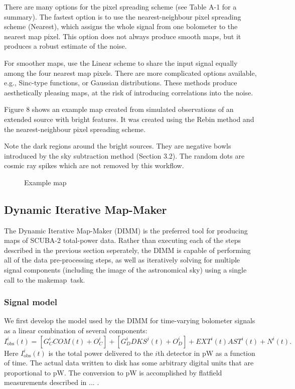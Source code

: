 \documentclass[twoside,11pt]{article}
\newcommand{\xref}[3]{#1}
\newcommand{\xlabel}[1]{}
\renewcommand{\_}{\texttt{\symbol{95}}}
\newcommand{\task}[1]{\textsf{#1}}
\newcommand{\makemap}{\xref{\task{makemap}}{sun258}{MAKEMAP}}
\begin{document}
There are many options for the pixel spreading scheme (see Table A-1
for a summary). The fastest option is to use the nearest-neighbour
pixel spreading scheme (Nearest), which assigns the whole signal from
one bolometer to the nearest map pixel. This option does not always
produce smooth maps, but it produces a robust estimate of the noise.

For smoother maps, use the Linear scheme to share the input signal
equally among the four nearest map pixels. There are more complicated
options available, e.g., Sinc-type functions, or Gaussian
distributions. These methods produce aesthetically pleasing maps, at
the risk of introducing correlations into the noise.

Figure 8 shows an example map created from simulated observations of
an extended source with bright features. It was created using the
Rebin method and the nearest-neighbour pixel spreading scheme.

Note the dark regions around the bright sources. They are negative
bowls introduced by the sky subtraction method (Section 3.2). The
random dots are cosmic ray spikes which are not removed by this
workflow.

\begin{figure}
\caption{Example map}
\end{figure}



\subsection{\xlabel{dimm}Dynamic Iterative Map-Maker\label{se:dimm}}

The Dynamic Iterative Map-Maker (DIMM) is the preferred tool for
producing maps of SCUBA-2 total-power data. Rather than executing each
of the steps described in the previous section seperately, the DIMM is
capable of performing all of the data pre-processing steps, as well as
iteratively solving for multiple signal components (including the
image of the astronomical sky) using a single call to the \makemap\
task. 

\subsubsection{Signal model}

We first develop the model used by the DIMM for time-varying bolometer
signals as a linear combination of several components:
%
\begin{equation}
I^i_{\mathrm{obs}}(t) = [G_C^i COM(t) + O_C^i] + [G_D^i DKS^j(t) + O_D^i] +
                      EXT^i(t) AST^i(t) + N^i(t).
\end{equation}
%
Here $I^i_{\mathrm{obs}}(t)$ is the total power delivered to the $i$th
detector in pW as a function of time. The actual data written to disk
has some arbitrary digital units that are proportional to pW. The
conversion to pW is accomplished by flatfield measurements described
in ... .
\end{document}
